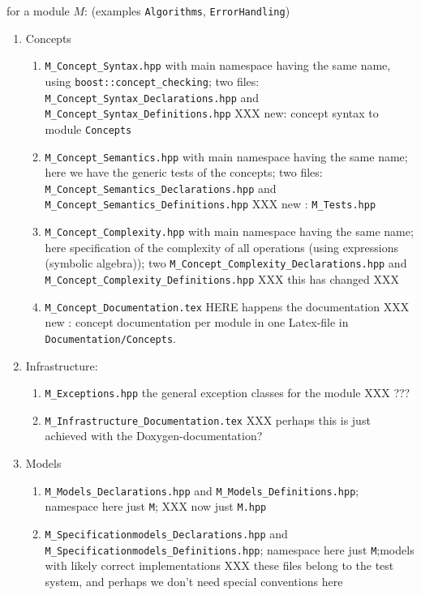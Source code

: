 \documentclass{book}
\newcommand{\filename}[1]{\texttt{#1}}
\newcommand{\name}[1]{\texttt{#1}}
\begin{document}
for a module $M$: (examples \name{Algorithms}, \name{ErrorHandling})
\begin{enumerate}\sloppy
\item Concepts
  \begin{enumerate}
  \item \filename{M\_Concept\_Syntax.hpp} with main namespace having the same name, using \name{boost::concept\_checking}; two files: \filename{M\_Concept\_Syntax\_Declarations.hpp} and \filename{M\_Concept\_Syntax\_Definitions.hpp} XXX new: concept syntax to module \texttt{Concepts}
  \item \filename{M\_Concept\_Semantics.hpp} with main namespace having the same name; here we have the generic tests of the concepts; two files: \filename{M\_Concept\_Semantics\_Declarations.hpp} and \filename{M\_Concept\_Semantics\_Definitions.hpp} XXX new : \texttt{M\_Tests.hpp}
  \item \filename{M\_Concept\_Complexity.hpp} with main namespace having the same name; here specification of the complexity of all operations (using expressions (symbolic algebra)); two \filename{M\_Concept\_Complexity\_Declarations.hpp} and  \filename{M\_Concept\_Complexity\_Definitions.hpp} XXX this has changed XXX
  \item \filename{M\_Concept\_Documentation.tex} HERE happens the documentation XXX new : concept documentation per module in one Latex-file in \texttt{Documentation/Concepts}.
  \end{enumerate}
\item Infrastructure:
  \begin{enumerate}
  \item \filename{M\_Exceptions.hpp} the general exception classes for the module XXX ???
  \item \filename{M\_Infrastructure\_Documentation.tex} XXX perhaps this is just achieved with the Doxygen-documentation?
  \end{enumerate}
\item Models
  \begin{enumerate}
  \item \filename{M\_Models\_Declarations.hpp} and \filename{M\_Models\_Definitions.hpp}; name\-space here just \name{M}; XXX now just \filename{M.hpp}
  \item  \filename{M\_Specificationmodels\_Declarations.hpp} and \filename{M\_Specificationmodels\_Definitions.hpp}; name\-space here just \name{M};models with likely correct implementations XXX these files belong to the test system, and perhaps we don't need special conventions here

\end{enumerate}
\end{enumerate}
\end{document}
